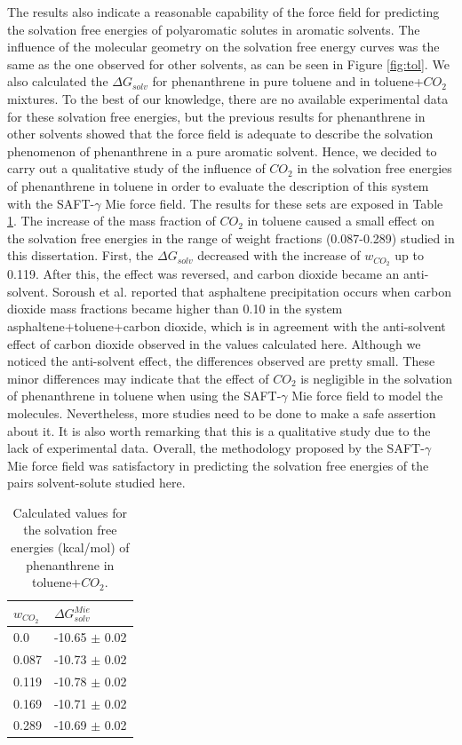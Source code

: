 \documentclass[final,12p,times,twocolumn]{elsarticle}
\begin{document}
	The results also indicate a reasonable capability of the force field for predicting the solvation free energies of polyaromatic solutes in aromatic solvents. The influence of the molecular geometry on the solvation free energy curves was the same as the one observed for other solvents, as can be seen in Figure \ref{fig:tol}.  We also calculated the $\Delta G_{solv}$ for phenanthrene in pure toluene and in toluene+$CO_{2}$ mixtures. To the best of our knowledge, there are no available experimental data for these solvation free energies, but the previous results for phenanthrene in other solvents showed that the force field is adequate to describe the solvation phenomenon of phenanthrene in a pure aromatic solvent. Hence, we decided to carry out a qualitative study of the influence of $CO_{2}$ in the solvation free energies of phenanthrene in toluene in order to evaluate the description of this system with the SAFT-$\gamma$ Mie force field. The results for these sets are exposed in Table \ref{tbl:solvco2}. The increase of the mass fraction of $CO_{2}$ in toluene caused a small effect on the solvation free energies in the range of weight fractions (0.087-0.289) studied in this dissertation. First, the $\Delta G_{solv}$ decreased with the increase of $w_{CO_{2}}$ up to 0.119. After this, the effect was reversed, and carbon dioxide became an anti-solvent. Soroush et al. \cite{SOROUSH2014405} reported that asphaltene precipitation occurs when carbon dioxide mass fractions became higher than 0.10 in the system asphaltene+toluene+carbon dioxide, which is in agreement with the anti-solvent effect of carbon dioxide observed in the values calculated here. Although we noticed the anti-solvent effect, the differences observed are pretty small. These minor differences may indicate that the effect of $CO_{2}$ is negligible in the solvation of phenanthrene in toluene when using the SAFT-$\gamma$ Mie force field to model the molecules. Nevertheless, more studies need to be done to make a safe assertion about it. It is also worth remarking that this is a qualitative study due to the lack of experimental data. Overall, the methodology proposed by the SAFT-$\gamma$ Mie force field was satisfactory in predicting the solvation free energies of the pairs solvent-solute studied here.  
	
	\begin{table}
		\centering
		\caption{Calculated values for the solvation free energies (kcal/mol) of phenanthrene in toluene+$CO_{2}$.}
		\label{tbl:solvco2}
		\begin{tabular}{ll}
			\hline\hline
			$w_{CO_{2}}$ & $\Delta G_{solv}^{Mie}$ \\ \hline
			0.0          & -10.65 $\pm$ 0.02       \\
			0.087        & -10.73 $\pm$ 0.02       \\
			0.119        & -10.78 $\pm$ 0.02       \\
			0.169        & -10.71 $\pm$ 0.02       \\
			0.289        & -10.69 $\pm$ 0.02       \\ \hline\hline
		\end{tabular}
	\end{table}
	
\end{document}
